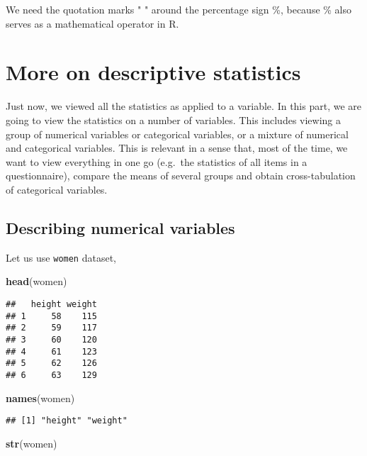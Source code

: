 \documentclass[]{book}
\newenvironment{Shaded}{\begin{snugshade}}{\end{snugshade}}
\newcommand{\KeywordTok}[1]{\textcolor[rgb]{0.13,0.29,0.53}{\textbf{{#1}}}}
\newcommand{\NormalTok}[1]{{#1}}
\theoremstyle{definition}
\theoremstyle{definition}
\theoremstyle{remark}
\begin{document}
We need the quotation marks " " around the percentage sign \%, because
\% also serves as a mathematical operator in R.

\section{More on descriptive
statistics}\label{more-on-descriptive-statistics}

Just now, we viewed all the statistics as applied to a variable. In this
part, we are going to view the statistics on a number of variables. This
includes viewing a group of numerical variables or categorical
variables, or a mixture of numerical and categorical variables. This is
relevant in a sense that, most of the time, we want to view everything
in one go (e.g.~the statistics of all items in a questionnaire), compare
the means of several groups and obtain cross-tabulation of categorical
variables.

\subsection{Describing numerical
variables}\label{describing-numerical-variables}

Let us use \texttt{women} dataset,

\begin{Shaded}
\begin{Highlighting}[]
\KeywordTok{head}\NormalTok{(women)}
\end{Highlighting}
\end{Shaded}

\begin{verbatim}
##   height weight
## 1     58    115
## 2     59    117
## 3     60    120
## 4     61    123
## 5     62    126
## 6     63    129
\end{verbatim}

\begin{Shaded}
\begin{Highlighting}[]
\KeywordTok{names}\NormalTok{(women)}
\end{Highlighting}
\end{Shaded}

\begin{verbatim}
## [1] "height" "weight"
\end{verbatim}

\begin{Shaded}
\begin{Highlighting}[]
\KeywordTok{str}\NormalTok{(women)}
\end{Highlighting}
\end{Shaded}
\end{document}
